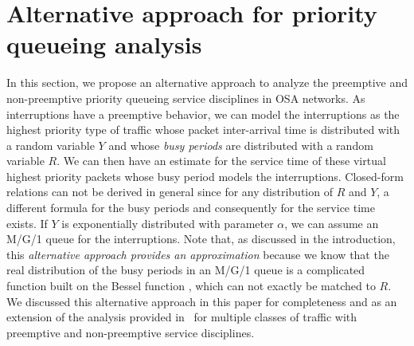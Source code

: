 \documentclass[11pt,journal,oneside,onecolumn,draftclsnofoot]{IEEEtran}
\begin{document}
\section{Alternative approach for priority queueing analysis}
\label{app:alt_approach}
In this section, we propose an alternative approach to analyze the preemptive and non-preemptive priority queueing service disciplines in OSA networks. As interruptions have a preemptive behavior, we can model the interruptions as the highest priority type of traffic whose packet inter-arrival time is distributed with a random variable $Y$ and whose \emph{busy periods} are distributed with a random variable $R$. We can then have an estimate for the service time of these virtual highest priority packets whose  busy period models the interruptions. Closed-form relations can not be derived in general since for any distribution of $R$ and $Y$, a different formula for the busy periods and consequently for the service time exists. If $Y$ is exponentially distributed with parameter $\alpha$, we can assume an  M/G/1 queue for the interruptions.  
Note that, as discussed in the introduction, this \emph{alternative approach provides an approximation} because we know that the real distribution of the busy periods in an M/G/1 queue is a complicated function built on the Bessel function \cite{takagi91}, which can not exactly be matched to $R$. We discussed this alternative approach in this paper for completeness and as an extension of the analysis provided in~\cite{wang-l11,rashid07,laourine10} for multiple classes of traffic with preemptive and non-preemptive service disciplines.
\end{document}

